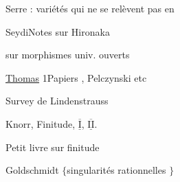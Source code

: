 Serre : variétés qui ne se relèvent pas en 

Seydi\qquad Notes sur  Hironaka

 sur morphismes univ. ouverts

\uline{Thomas} 1\qquad Papiers , Pelczynski etc

Survey de Lindenstrauss \unsure{---|--}

\uline{}\qquad Knorr, Finitude, $\overline{\underline{\mathrm I}}$, $\overline{\underline{\mathrm {II}}}$.

Petit livre sur finitude

Goldschmidt\qquad {} $\{$singularités rationnelles $\}$

\qquad {}


\clearpage
\normalmarginpar
